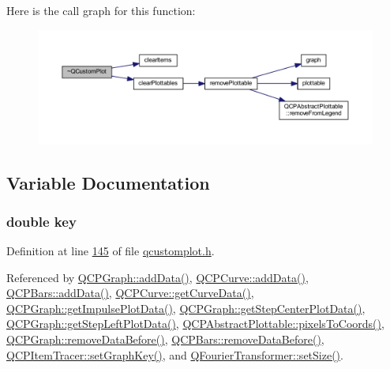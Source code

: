 Here is the call graph for this function\+:
\nopagebreak
\begin{figure}[H]
\begin{center}
\leavevmode
\includegraphics[width=350pt]{d4/d3e/a00116_a75d9b6f599dcae706e45efd425c5499e_cgraph}
\end{center}
\end{figure}




\subsection{Variable Documentation}
\hypertarget{a00116_a94bb892c30911cd62cba0707a5395be4}{
\subsubsection[{key}]{\setlength{\rightskip}{0pt plus 5cm}double key}}\label{a00116_a94bb892c30911cd62cba0707a5395be4}


Definition at line \hyperlink{a00116_source_l00145}{145} of file \hyperlink{a00116_source}{qcustomplot.\+h}.



Referenced by \hyperlink{a00115_source_l00713}{Q\+C\+P\+Graph\+::add\+Data()}, \hyperlink{a00115_source_l09367}{Q\+C\+P\+Curve\+::add\+Data()}, \hyperlink{a00115_source_l10049}{Q\+C\+P\+Bars\+::add\+Data()}, \hyperlink{a00115_source_l09591}{Q\+C\+P\+Curve\+::get\+Curve\+Data()}, \hyperlink{a00115_source_l01347}{Q\+C\+P\+Graph\+::get\+Impulse\+Plot\+Data()}, \hyperlink{a00115_source_l01244}{Q\+C\+P\+Graph\+::get\+Step\+Center\+Plot\+Data()}, \hyperlink{a00115_source_l01090}{Q\+C\+P\+Graph\+::get\+Step\+Left\+Plot\+Data()}, \hyperlink{a00115_source_l08716}{Q\+C\+P\+Abstract\+Plottable\+::pixels\+To\+Coords()}, \hyperlink{a00115_source_l00741}{Q\+C\+P\+Graph\+::remove\+Data\+Before()}, \hyperlink{a00115_source_l10078}{Q\+C\+P\+Bars\+::remove\+Data\+Before()}, \hyperlink{a00115_source_l14825}{Q\+C\+P\+Item\+Tracer\+::set\+Graph\+Key()}, and \hyperlink{a00121_source_l00066}{Q\+Fourier\+Transformer\+::set\+Size()}.

